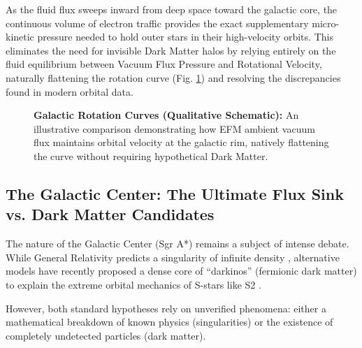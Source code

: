 \documentclass[11pt, a4paper]{article}
\begin{document}
As the fluid flux sweeps inward from deep space toward the galactic core, the continuous volume of electron traffic provides the exact supplementary micro-kinetic pressure needed to hold outer stars in their high-velocity orbits. This eliminates the need for invisible Dark Matter halos by relying entirely on the fluid equilibrium between Vacuum Flux Pressure and Rotational Velocity, naturally flattening the rotation curve (Fig. \ref{fig:rotation_curve}) and resolving the discrepancies found in modern orbital data.

\begin{figure}[!ht]
\centering
{}
\caption{\textbf{Galactic Rotation Curves (Qualitative Schematic):} An illustrative comparison demonstrating how EFM ambient vacuum flux maintains orbital velocity at the galactic rim, natively flattening the curve without requiring hypothetical Dark Matter.}
\label{fig:rotation_curve}
\end{figure}

\subsection{The Galactic Center: The Ultimate Flux Sink vs. Dark Matter Candidates}

The nature of the Galactic Center (Sgr A*) remains a subject of intense debate. While General Relativity predicts a singularity of infinite density \cite{Gravity2020}, alternative models have recently proposed a dense core of ``darkinos'' (fermionic dark matter) to explain the extreme orbital mechanics of S-stars like S2 \cite{BecerraVergara2021}. 

However, both standard hypotheses rely on unverified phenomena: either a mathematical breakdown of known physics (singularities) or the existence of completely undetected particles (dark matter).
\end{document}
